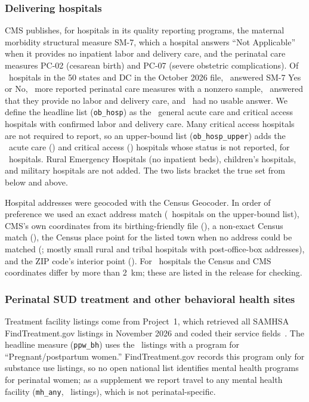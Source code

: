 \documentclass[10pt,twocolumn,letterpaper]{article}
\begin{document}
\subsubsection{Delivering hospitals}
CMS publishes, for hospitals in its quality reporting programs, the maternal morbidity structural measure SM-7, which a hospital answers ``Not Applicable'' when it provides no inpatient labor and delivery care, and the perinatal care measures PC-02 (cesarean birth) and PC-07 (severe obstetric complications). Of \CMSTotal\ hospitals in the 50 states and DC in the October 2026 file, \CMSConfSM\ answered SM-7 Yes or No, \CMSConfPC\ more reported perinatal care measures with a nonzero sample, \CMSNoLD\ answered that they provide no labor and delivery care, and \CMSNotRep\ had no usable answer. We define the headline list (\texttt{ob\_hosp}) as the \SitesOB\ general acute care and critical access hospitals with confirmed labor and delivery care. Many critical access hospitals are not required to report, so an upper-bound list (\texttt{ob\_hosp\_upper}) adds the \SitesOBAdded\ acute care (\AddedAcute) and critical access (\AddedCAH) hospitals whose status is not reported, for \SitesOBU\ hospitals. Rural Emergency Hospitals (no inpatient beds), children's hospitals, and military hospitals are not added. The two lists bracket the true set from below and above.

Hospital addresses were geocoded with the Census Geocoder. In order of preference we used an exact address match (\HospExact\ hospitals on the upper-bound list), CMS's own coordinates from its birthing-friendly file (\HospCMS), a non-exact Census match (\HospNonexact), the Census place point for the listed town when no address could be matched (\HospTown; mostly small rural and tribal hospitals with post-office-box addresses), and the ZIP code's interior point (\HospZip). For \GeocodeDiff\ hospitals the Census and CMS coordinates differ by more than 2~km; these are listed in the release for checking.

\subsubsection{Perinatal SUD treatment and other behavioral health sites}
Treatment facility listings come from Project~1, which retrieved all SAMHSA FindTreatment.gov listings in November 2026 and coded their service fields~\cite{emesobum_p1}. The headline measure (\texttt{ppw\_bh}) uses the \SitesPPW\ listings with a program for ``Pregnant/postpartum women.'' FindTreatment.gov records this program only for substance use listings, so no open national list identifies mental health programs for perinatal women; as a supplement we report travel to any mental health facility (\texttt{mh\_any}, \SitesMH\ listings), which is not perinatal-specific.
\end{document}
